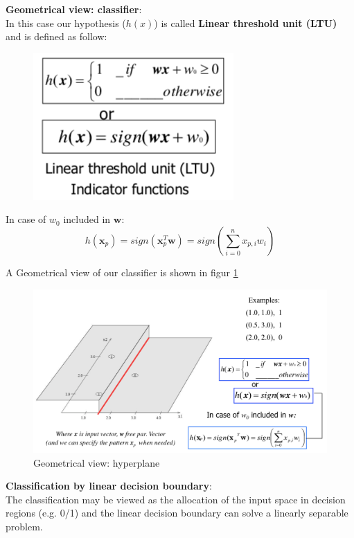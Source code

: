 \documentclass[../main.tex]{subfiles}
\begin{document}
\noindent \textbf{Geometrical view: classifier}:\\
In this case our hypothesis ($h(x)$) is called \textbf{Linear threshold unit (LTU)} and is defined as follow:
\begin{figure}[H]
    \centering
    \includegraphics[scale = 0.4]{lectures/2_linear_model/2_LTU.png}
\end{figure}
In case of $w_0$ included in $\mathbf{w}$:
$$ h(\mathbf{x}_p) = sign(\mathbf{x}^T_p\mathbf{w}) = sign(\sum_{i = 0}^{n}x_{p,i}w_i)$$

\noindent A Geometrical view of our classifier is shown in figur \ref{fig:2_hyperplane_classifier}
\begin{figure}[H]
    \centering
    \includegraphics[scale = 0.2]{lectures/2_linear_model/2_hyperplane_classifier.png}
    \caption{Geometrical view: hyperplane}
    \label{fig:2_hyperplane_classifier}
\end{figure}

\noindent \textbf{Classification by linear decision boundary}:\\
The classification may be viewed as the allocation of the input space in decision regions (e.g. 0/1) and the linear decision boundary can solve a linearly separable problem.
\end{document}

